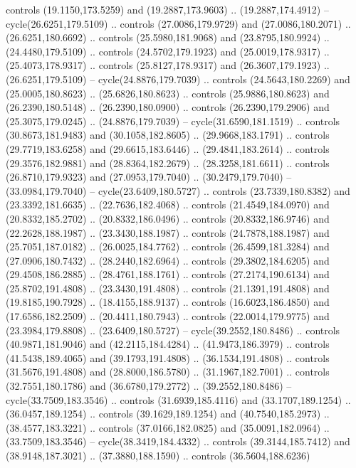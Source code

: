 \begin{scope}[cm={{1.25,0.0,0.0,-1.25,(0.0,442.91375)}}]
    controls (19.1150,173.5259) and (19.2887,173.9603) .. (19.2887,174.4912) --
    cycle(26.6251,179.5109) .. controls (27.0086,179.9729) and (27.0086,180.2071)
    .. (26.6251,180.6692) .. controls (25.5980,181.9068) and (23.8795,180.9924) ..
    (24.4480,179.5109) .. controls (24.5702,179.1923) and (25.0019,178.9317) ..
    (25.4073,178.9317) .. controls (25.8127,178.9317) and (26.3607,179.1923) ..
    (26.6251,179.5109) -- cycle(24.8876,179.7039) .. controls (24.5643,180.2269)
    and (25.0005,180.8623) .. (25.6826,180.8623) .. controls (25.9886,180.8623)
    and (26.2390,180.5148) .. (26.2390,180.0900) .. controls (26.2390,179.2906)
    and (25.3075,179.0245) .. (24.8876,179.7039) -- cycle(31.6590,181.1519) ..
    controls (30.8673,181.9483) and (30.1058,182.8605) .. (29.9668,183.1791) ..
    controls (29.7719,183.6258) and (29.6615,183.6446) .. (29.4841,183.2614) ..
    controls (29.3576,182.9881) and (28.8364,182.2679) .. (28.3258,181.6611) ..
    controls (26.8710,179.9323) and (27.0953,179.7040) .. (30.2479,179.7040) --
    (33.0984,179.7040) -- cycle(23.6409,180.5727) .. controls (23.7339,180.8382)
    and (23.3392,181.6635) .. (22.7636,182.4068) .. controls (21.4549,184.0970)
    and (20.8332,185.2702) .. (20.8332,186.0496) .. controls (20.8332,186.9746)
    and (22.2628,188.1987) .. (23.3430,188.1987) .. controls (24.7878,188.1987)
    and (25.7051,187.0182) .. (26.0025,184.7762) .. controls (26.4599,181.3284)
    and (27.0906,180.7432) .. (28.2440,182.6964) .. controls (29.3802,184.6205)
    and (29.4508,186.2885) .. (28.4761,188.1761) .. controls (27.2174,190.6134)
    and (25.8702,191.4808) .. (23.3430,191.4808) .. controls (21.1391,191.4808)
    and (19.8185,190.7928) .. (18.4155,188.9137) .. controls (16.6023,186.4850)
    and (17.6586,182.2509) .. (20.4411,180.7943) .. controls (22.0014,179.9775)
    and (23.3984,179.8808) .. (23.6409,180.5727) -- cycle(39.2552,180.8486) ..
    controls (40.9871,181.9046) and (42.2115,184.4284) .. (41.9473,186.3979) ..
    controls (41.5438,189.4065) and (39.1793,191.4808) .. (36.1534,191.4808) ..
    controls (31.5676,191.4808) and (28.8000,186.5780) .. (31.1967,182.7001) ..
    controls (32.7551,180.1786) and (36.6780,179.2772) .. (39.2552,180.8486) --
    cycle(33.7509,183.3546) .. controls (31.6939,185.4116) and (33.1707,189.1254)
    .. (36.0457,189.1254) .. controls (39.1629,189.1254) and (40.7540,185.2973) ..
    (38.4577,183.3221) .. controls (37.0166,182.0825) and (35.0091,182.0964) ..
    (33.7509,183.3546) -- cycle(38.3419,184.4332) .. controls (39.3144,185.7412)
    and (38.9148,187.3021) .. (37.3880,188.1590) .. controls (36.5604,188.6236)

\end{scope}

